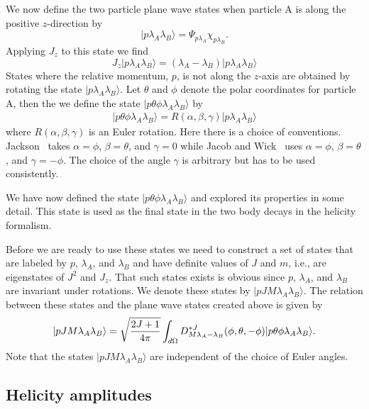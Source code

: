 We now define the two particle plane wave states when particle
A is along the positive $z$-direction by
\begin{equation}
|p\lambda_{A}\lambda_{B}\rangle=\Psi_{p\lambda_{A}}\chi_{p\lambda_{B}}.
\end{equation}
Applying $J_z$ to this state we find 
\begin{equation}
J_z|p\lambda_{A}\lambda_{B}\rangle=
(\lambda_A-\lambda_B)|p\lambda_{A}\lambda_{B}\rangle
\end{equation}
States where the relative momentum, $p$, is not along the $z$-axis are
obtained by rotating the state $|p\lambda_{A}\lambda_{B}\rangle$.
Let $\theta$ and $\phi$ denote the polar coordinates for particle A, then
the we define the state $|p\theta\phi\lambda_{A}\lambda_{B}\rangle$ by
\begin{eqnarray}
|p\theta\phi\lambda_{A}\lambda_{B}\rangle=R(\alpha,\beta,\gamma)
             |p\lambda_{A}\lambda_{B}\rangle
\end{eqnarray}
where $R(\alpha,\beta,\gamma)$ is an Euler rotation. Here there is a 
choice of conventions. Jackson~\cite{Jack64} takes 
$\alpha=\phi$, $\beta=\theta$, and $\gamma=0$ while Jacob 
and Wick~\cite{Jaco59} uses $\alpha=\phi$, $\beta=\theta$, and $\gamma=-\phi$.
The choice of the angle $\gamma$ is arbitrary but has to be used 
consistently. 

We have now defined the state $|p\theta\phi\lambda_A\lambda_B\rangle$
and explored its properties in some detail. This state is used as the
final state in the two body decays in the helicity formalism. 

Before we are ready to use these states we need to construct a set
of states that are labeled by $p$, $\lambda_A$, and $\lambda_B$ and
have definite values of $J$ and $m$, i.e., are eigenstates of
$J^2$ and $J_z$. That such states exists is obvious since $p$,
$\lambda_A$, and $\lambda_B$ are invariant under rotations. We 
denote these states by $|pJM\lambda_A\lambda_B\rangle$. The relation
between these states and the plane wave states created above is given by
\begin{equation}
|pJM\lambda_A\lambda_B\rangle=\sqrt{{2J+1}\over{ 4\pi}}
\int_{d\Omega}D^{*J}_{M\lambda_A-\lambda_B}(\phi,\theta,-\phi)
|p\theta\phi\lambda_A\lambda_B\rangle.
\label{eq:planewaveexpansion}
\end{equation}
Note that the states $|pJM\lambda_A\lambda_B\rangle$ are independent 
of the choice of Euler angles.


\subsection{Helicity amplitudes}

